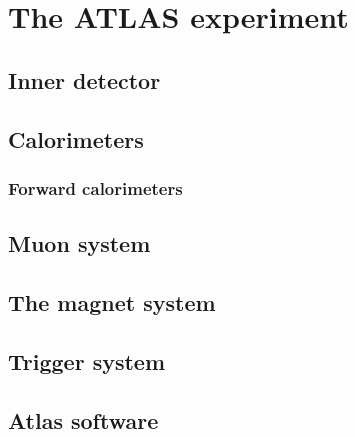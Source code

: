 \chapter{The ATLAS experiment}
\section{Inner detector}
\section{Calorimeters}
\subsection{Forward calorimeters}\label{sec:forwardCalo}
\section{Muon system}
\section{The magnet system}
\section{Trigger system}
\section{Atlas software}